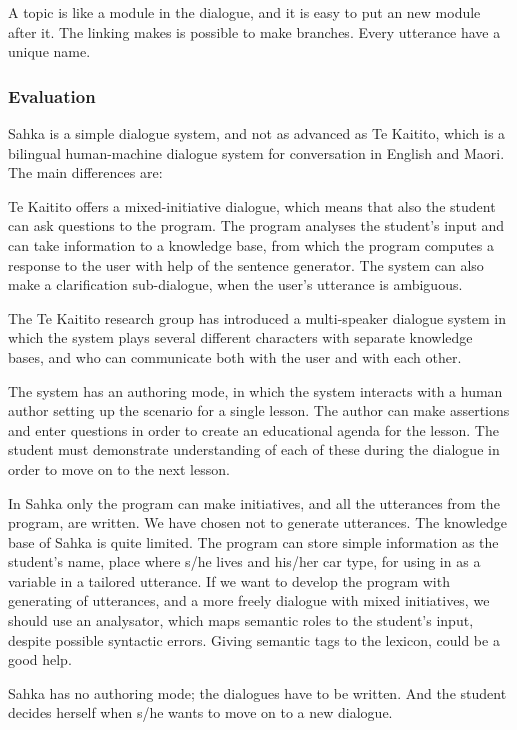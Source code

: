 \documentclass[a4paper,12pt]{article}
\begin{document}
A topic is like a module in the dialogue, and it is easy to put an new module after it. The linking makes is possible to make branches. Every utterance have a unique name.  

\subsubsection{Evaluation}
Sahka is a simple dialogue system, and not as advanced as Te Kaitito, which is a bilingual human-machine dialogue system for conversation in English and Maori. The main differences are:

Te Kaitito offers a mixed-initiative dialogue, which means that also the student can ask questions to the program. The program analyses the student's input and can take information to a knowledge base, from which the program computes a response to the user with help of the sentence generator. The system can also make a clarification sub-dialogue, when the user's utterance is ambiguous. \citep{KnotMoorMean200350}

The Te Kaitito research group has introduced a multi-speaker dialogue system in which the system plays several different characters with separate knowledge bases, and who can communicate both with the user and with each other.   
\citep{VlugterKnott06}

The system has an authoring mode, in which the system interacts with a human author setting up the scenario for a single lesson. The author can make assertions and enter questions in order to create an educational agenda for the lesson. The student must demonstrate understanding of each of these during the dialogue in order to move on to the next lesson. \citep{VlugterKnotWeatherall04} \citep{VlugterKnott06}

In Sahka only the program can make initiatives, and all the utterances from the program, are written. We have chosen not to generate utterances. The knowledge base of Sahka is quite limited. The program can store simple information as the student's name, place where s/he lives and his/her car type, for using in as a variable in a tailored utterance. If we want to develop the program with generating of utterances, and a more freely dialogue with mixed initiatives, we should use an analysator, which maps semantic roles to the student's input, despite possible syntactic errors. Giving semantic tags to the lexicon, could be a good help. 

Sahka has no authoring mode; the dialogues have to be written. And the student decides herself when s/he wants to move on to a new dialogue. %
 
\end{document}
